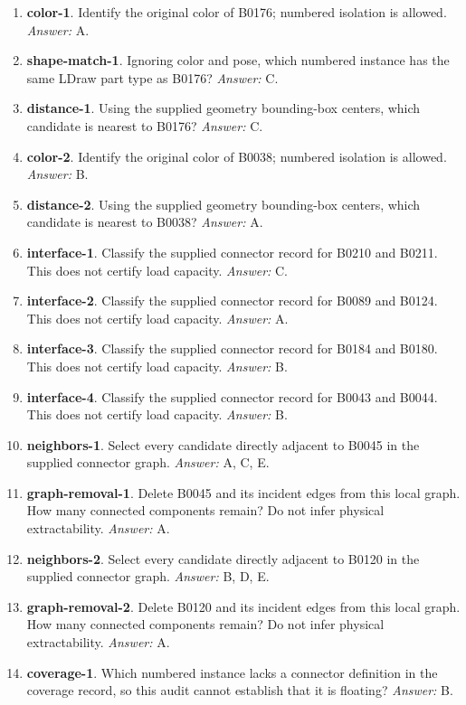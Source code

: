 \begin{enumerate}
\item \textbf{color-1}. Identify the original color of B0176; numbered isolation is allowed. \textit{Answer:} A.
\item \textbf{shape-match-1}. Ignoring color and pose, which numbered instance has the same LDraw part type as B0176? \textit{Answer:} C.
\item \textbf{distance-1}. Using the supplied geometry bounding-box centers, which candidate is nearest to B0176? \textit{Answer:} C.
\item \textbf{color-2}. Identify the original color of B0038; numbered isolation is allowed. \textit{Answer:} B.
\item \textbf{distance-2}. Using the supplied geometry bounding-box centers, which candidate is nearest to B0038? \textit{Answer:} A.
\item \textbf{interface-1}. Classify the supplied connector record for B0210 and B0211. This does not certify load capacity. \textit{Answer:} C.
\item \textbf{interface-2}. Classify the supplied connector record for B0089 and B0124. This does not certify load capacity. \textit{Answer:} A.
\item \textbf{interface-3}. Classify the supplied connector record for B0184 and B0180. This does not certify load capacity. \textit{Answer:} B.
\item \textbf{interface-4}. Classify the supplied connector record for B0043 and B0044. This does not certify load capacity. \textit{Answer:} B.
\item \textbf{neighbors-1}. Select every candidate directly adjacent to B0045 in the supplied connector graph. \textit{Answer:} A, C, E.
\item \textbf{graph-removal-1}. Delete B0045 and its incident edges from this local graph. How many connected components remain? Do not infer physical extractability. \textit{Answer:} A.
\item \textbf{neighbors-2}. Select every candidate directly adjacent to B0120 in the supplied connector graph. \textit{Answer:} B, D, E.
\item \textbf{graph-removal-2}. Delete B0120 and its incident edges from this local graph. How many connected components remain? Do not infer physical extractability. \textit{Answer:} A.
\item \textbf{coverage-1}. Which numbered instance lacks a connector definition in the coverage record, so this audit cannot establish that it is floating? \textit{Answer:} B.

\end{enumerate}
